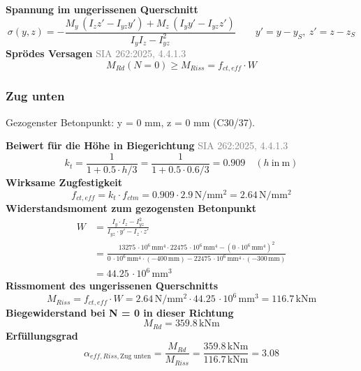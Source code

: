 \documentclass[11pt,a4paper]{article}
\newcommand{\normref}[1]{{\small\textcolor{gray}{#1}}}
\begin{document}
\noindent\textbf{Spannung im ungerissenen Querschnitt}
\begin{equation*}
\sigma(y, z) = -\frac{M_y\,(I_z z' - I_{yz} y') + M_z\,(I_y y' - I_{yz} z')}{I_y I_z - I_{yz}^2}\qquad y' = y - y_S,\ z' = z - z_S
\end{equation*}
\noindent\textbf{Sprödes Versagen} \hfill \normref{SIA 262:2025, 4.4.1.3}
\begin{equation*}
M_{Rd}(N = 0) \ge M_{Riss} = f_{ct,eff} \cdot W
\end{equation*}
\subsubsection{Zug unten}
Gezogenster Betonpunkt: y = 0 mm, z = 0 mm (C30/37).

\noindent\textbf{Beiwert für die Höhe in Biegerichtung} \hfill \normref{SIA 262:2025, 4.4.1.3}
\begin{equation*}
k_t = \frac{1}{1 + 0.5 \cdot h/3} = \frac{1}{1 + 0.5 \cdot 0.6/3} = 0.909 \quad \left(h\ \text{in}\ \mathrm{m}\right)
\end{equation*}
\noindent\textbf{Wirksame Zugfestigkeit}
\begin{equation*}
f_{ct,eff} = k_t \cdot f_{ctm} = 0.909 \cdot 2.9\,\mathrm{N}/\mathrm{mm}^{2} = 2.64\,\mathrm{N}/\mathrm{mm}^{2}
\end{equation*}
\noindent\textbf{Widerstandsmoment zum gezogensten Betonpunkt}
\begin{equation*}
\begin{aligned}
  W &= \frac{I_y \cdot I_z - I_{yz}^{2}}{I_{yz} \cdot y' - I_z \cdot z'} \\
  &= \frac{13275\,\cdot 10^{6}\,\mathrm{mm}^{4} \cdot 22475\,\cdot 10^{6}\,\mathrm{mm}^{4} - \left(0\,\cdot 10^{6}\,\mathrm{mm}^{4}\right)^{2}}{0\,\cdot 10^{6}\,\mathrm{mm}^{4} \cdot \left(-400\,\mathrm{mm}\right) - 22475\,\cdot 10^{6}\,\mathrm{mm}^{4} \cdot \left(-300\,\mathrm{mm}\right)} \\
  &= 44.25\,\cdot 10^{6}\,\mathrm{mm}^{3}
\end{aligned}
\end{equation*}
\noindent\textbf{Rissmoment des ungerissenen Querschnitts}
\begin{equation*}
M_{Riss} = f_{ct,eff} \cdot W = 2.64\,\mathrm{N}/\mathrm{mm}^{2} \cdot 44.25\,\cdot 10^{6}\,\mathrm{mm}^{3} = 116.7\,\mathrm{kNm}
\end{equation*}
\noindent\textbf{Biegewiderstand bei N = 0 in dieser Richtung}
\begin{equation*}
M_{Rd} = 359.8\,\mathrm{kNm}
\end{equation*}
\noindent\textbf{Erfüllungsgrad}
\begin{equation*}
\alpha_{eff,Riss,\text{Zug unten}} = \frac{M_{Rd}}{M_{Riss}} = \frac{359.8\,\mathrm{kNm}}{116.7\,\mathrm{kNm}} = 3.08
\end{equation*}
\end{document}
